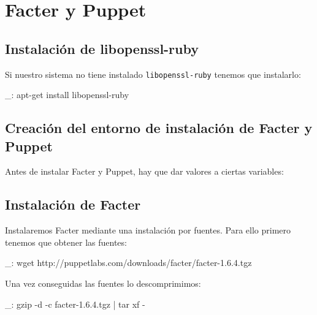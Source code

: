 \chapter{Facter y Puppet}
\label{comun:puppet}

\section{Instalación de libopenssl-ruby}

Si nuestro sistema no tiene instalado \texttt{libopenssl-ruby} tenemos que instalarlo:

\begin{bashcode}
_: apt-get install libopenssl-ruby
\end{bashcode}


\section{Creación del entorno de instalación de Facter y Puppet}

Antes de instalar Facter y Puppet, hay que dar valores a ciertas variables:



\section{Instalación de Facter}

Instalaremos Facter mediante una instalación por fuentes. Para ello primero tenemos que obtener las fuentes:

\begin{bashcode}
_: wget http://puppetlabs.com/downloads/facter/facter-1.6.4.tgz
\end{bashcode}

Una vez conseguidas las fuentes lo descomprimimos:

\begin{bashcode}
_: gzip -d -c facter-1.6.4.tgz | tar xf -
\end{bashcode}

